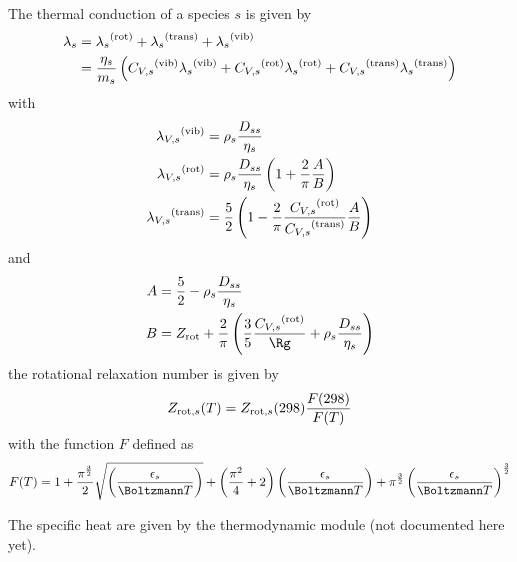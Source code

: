 The thermal conduction of a species $s$ is given by
\begin{equation}
\begin{split}
\thermcond[s] & = \thermcond[s]^{(\text{rot})} + \thermcond[s]^{(\text{trans})} + \thermcond[s]^{(\text{vib})} \\
              & = \frac{\vis[s]}{\Mass[s]} \left(
                        \foreach \signe/\mode in {/vib,+/rot,+/trans}
                                {\signe \specificHeat[\Vol,s]^{(\text{\mode})}\thermcond[s]^{(\text{\mode})}}
                                          \right)
\end{split}
\label{transport:therm_cond}
\end{equation}
with
\begin{equation}
\begin{split}
\thermcond[\Vol,s]^{(\text{vib})}   & = \mass[s] \frac{\diff[s s]}{\vis[s]} \\
\thermcond[\Vol,s]^{(\text{rot})}   & = \mass[s] \frac{\diff[s s]}{\vis[s]}\left(1 + \frac{2}{\pi}\frac{A}{B}\right) \\
\thermcond[\Vol,s]^{(\text{trans})} & = \frac{5}{2} \left(1 - \frac{2}{\pi}\frac{\specificHeat[\Vol,s]^{(\text{rot})}}{\specificHeat[\Vol,s]^{(\text{trans})}}\frac{A}{B}\right)
\end{split}
\label{thermal_cond:modes}
\end{equation}
and
\begin{equation}
\begin{split}
  A & = \frac{5}{2} - \mass[s] \frac{\diff[s s]}{\vis[s]} \\
  B & = \rotRelax + \frac{2}{\pi} \left(\frac{3}{5}\frac{\specificHeat[\Vol,s]^{(\text{rot})}}{\Rg} + \mass[s] \frac{\diff[s s]}{\vis[s]}\right)
\end{split}
\label{thermal_cond:A_B}
\end{equation}
the rotational relaxation number is given by
\begin{equation}
\rotRelax[,s](\Temp) = \rotRelax[,s](298)\frac{F(298)}{F(\Temp)}
\label{thermal_cond:Zrot}
\end{equation}
with the function $F$ defined as
\begin{equation}
F(T) = 1 + \frac{\pi^{\frac{3}{2}}}{2}\sqrt{\left(\frac{\LJdepth[s]}{\Boltzmann\Temp}\right)}
         + \left(\frac{\pi^2}{4} + 2\right)\left(\frac{\LJdepth[s]}{\Boltzmann\Temp}\right)
         + \pi^{\frac{3}{2}}\left(\frac{\LJdepth[s]}{\Boltzmann\Temp}\right)^{\frac{3}{2}}
\label{therm_cond:F}
\end{equation}

The specific heat are given by the thermodynamic module (not documented here yet).
